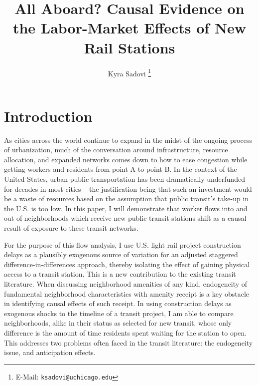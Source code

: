 \documentclass[12pt]{article}
\title{\textbf{All Aboard? Causal Evidence on the Labor-Market Effects of New Rail Stations}}
\author{Kyra Sadovi%
  \thanks{E-Mail: \texttt{ksadovi@uchicago.edu}}}
\affil{Harris School of Public Policy, University of Chicago}
\date{}
\begin{document}
\maketitle
\thispagestyle{empty}
 \begin{abstract}
 \noindent 
 \end{abstract}
\newpage
\section{Introduction}
As cities across the world continue to expand in the midst of the ongoing process of urbanization, much of the conversation around infrastructure, resource allocation, and expanded networks comes down to how to ease congestion while getting workers and residents from point A to point B. In the context of the United States, urban public transportation has been dramatically underfunded for decades in most cities  --  the justification being that such an investment would be a waste of resources based on the assumption that public transit's take-up in the U.S. is too low. In this paper, I will demonstrate that worker flows into and out of neighborhoods which receive new public transit stations shift as a causal result of exposure to these transit networks.

For the purpose of this flow analysis, I use U.S. light rail project construction delays as a plausibly exogenous source of variation for an adjusted staggered difference-in-differences approach, thereby isolating the effect of gaining physical access to a transit station. This is a new contribution to the existing transit literature. When discussing neighborhood amenities of any kind, endogeneity of fundamental neighborhood characteristics with amenity receipt is a key obstacle in identifying causal effects of such receipt. In using construction delays as exogenous shocks to the timeline of a transit project, I am able to compare neighborhoods, alike in their status as selected for new transit, whose only difference is the amount of time residents spent waiting for the station to open. This addresses two problems often faced in the transit literature: the endogeneity issue, and anticipation effects. 
\end{document}
